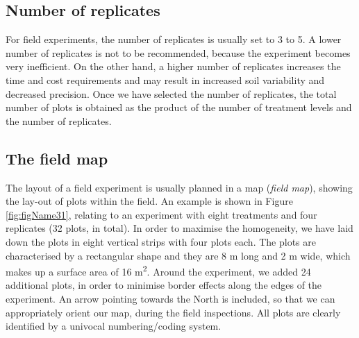 \documentclass[a4paper,12pt,oneside]{book}
\begin{document}
\hypertarget{number-of-replicates}{%
\subsection{Number of replicates}\label{number-of-replicates}}

For field experiments, the number of replicates is usually set to 3 to 5. A lower number of replicates is not to be recommended, because the experiment becomes very inefficient. On the other hand, a higher number of replicates increases the time and cost requirements and may result in increased soil variability and decreased precision. Once we have selected the number of replicates, the total number of plots is obtained as the product of the number of treatment levels and the number of replicates.

\hypertarget{the-field-map}{%
\subsection{The field map}\label{the-field-map}}

The layout of a field experiment is usually planned in a map (\emph{field map}), showing the lay-out of plots within the field. An example is shown in Figure \ref{fig:figName31}, relating to an experiment with eight treatments and four replicates (32 plots, in total). In order to maximise the homogeneity, we have laid down the plots in eight vertical strips with four plots each. The plots are characterised by a rectangular shape and they are 8 m long and 2 m wide, which makes up a surface area of 16 m\textsuperscript{2}. Around the experiment, we added 24 additional plots, in order to minimise border effects along the edges of the experiment. An arrow pointing towards the North is included, so that we can appropriately orient our map, during the field inspections. All plots are clearly identified by a univocal numbering/coding system.
\end{document}
